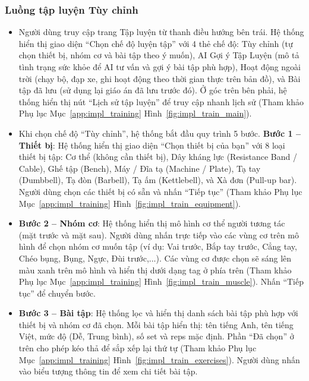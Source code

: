 \subsubsection{Luồng tập luyện Tùy chỉnh}

\begin{itemize}
    \item Người dùng truy cập trang Tập luyện từ thanh điều hướng bên trái. Hệ thống hiển thị giao diện ``Chọn chế độ luyện tập'' với 4 thẻ chế độ: Tùy chỉnh (tự chọn thiết bị, nhóm cơ và bài tập theo ý muốn), AI Gợi ý Tập Luyện (mô tả tình trạng sức khỏe để AI tư vấn và gợi ý bài tập phù hợp), Hoạt động ngoài trời (chạy bộ, đạp xe, ghi hoạt động theo thời gian thực trên bản đồ), và Bài tập đã lưu (sử dụng lại giáo án đã lưu trước đó). Ở góc trên bên phải, hệ thống hiển thị nút ``Lịch sử tập luyện'' để truy cập nhanh lịch sử (Tham khảo Phụ lục Mục~\ref{app:impl_training} Hình~\ref{fig:impl_train_main}).


    \item Khi chọn chế độ ``Tùy chỉnh'', hệ thống bắt đầu quy trình 5 bước. \textbf{Bước 1 -- Thiết bị}: Hệ thống hiển thị giao diện ``Chọn thiết bị của bạn'' với 8 loại thiết bị tập: Cơ thể (không cần thiết bị), Dây kháng lực (Resistance Band / Cable), Ghế tập (Bench), Máy / Đĩa tạ (Machine / Plate), Tạ tay (Dumbbell), Tạ đòn (Barbell), Tạ ấm (Kettlebell), và Xà đơn (Pull-up bar). Người dùng chọn các thiết bị có sẵn và nhấn ``Tiếp tục'' (Tham khảo Phụ lục Mục~\ref{app:impl_training} Hình~\ref{fig:impl_train_equipment}).


    \item \textbf{Bước 2 -- Nhóm cơ}: Hệ thống hiển thị mô hình cơ thể người tương tác (mặt trước và mặt sau). Người dùng nhấn trực tiếp vào các vùng cơ trên mô hình để chọn nhóm cơ muốn tập (ví dụ: Vai trước, Bắp tay trước, Cẳng tay, Chéo bụng, Bụng, Ngực, Đùi trước,...). Các vùng cơ được chọn sẽ sáng lên màu xanh trên mô hình và hiển thị dưới dạng tag ở phía trên (Tham khảo Phụ lục Mục~\ref{app:impl_training} Hình~\ref{fig:impl_train_muscle}). Nhấn ``Tiếp tục'' để chuyển bước.


    \item \textbf{Bước 3 -- Bài tập}: Hệ thống lọc và hiển thị danh sách bài tập phù hợp với thiết bị và nhóm cơ đã chọn. Mỗi bài tập hiển thị: tên tiếng Anh, tên tiếng Việt, mức độ (Dễ, Trung bình), số set và reps mặc định. Phần ``Đã chọn'' ở trên cho phép kéo thả để sắp xếp lại thứ tự (Tham khảo Phụ lục Mục~\ref{app:impl_training} Hình~\ref{fig:impl_train_exercises}). Người dùng nhấn vào biểu tượng thông tin để xem chi tiết bài tập.



\end{itemize}
